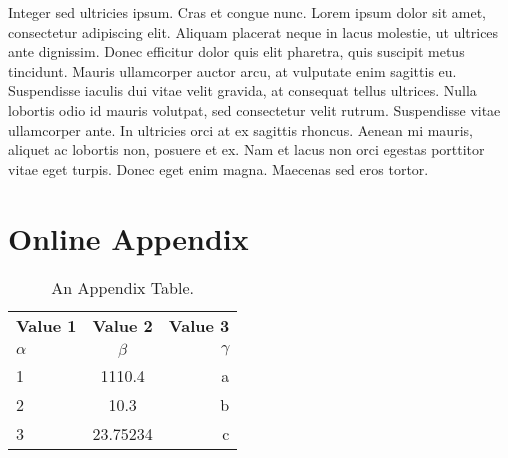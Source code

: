 \documentclass[man]{apa7}
\begin{document}
Integer sed ultricies ipsum. Cras et congue nunc. Lorem ipsum dolor sit amet, consectetur adipiscing elit. Aliquam placerat neque in lacus molestie, ut ultrices ante dignissim. Donec efficitur dolor quis elit pharetra, quis suscipit metus tincidunt. Mauris ullamcorper auctor arcu, at vulputate enim sagittis eu. Suspendisse iaculis dui vitae velit gravida, at consequat tellus ultrices. Nulla lobortis odio id mauris volutpat, sed consectetur velit rutrum. Suspendisse vitae ullamcorper ante. In ultricies orci at ex sagittis rhoncus. Aenean mi mauris, aliquet ac lobortis non, posuere et ex. Nam et lacus non orci egestas porttitor vitae eget turpis. Donec eget enim magna. Maecenas sed eros tortor.

\begingroup
\def\enotesize{\normalsize}
\theendnotes
\endgroup

\printbibliography

\appendix

\section{Online Appendix}

\begin{table}
	\begin{center}
		\caption{An Appendix Table.}
		\label{tab:apptable}
		\begin{tabular}{l|c|r} %
			\textbf{Value 1} & \textbf{Value 2} & \textbf{Value 3}\\
			$\alpha$ & $\beta$ & $\gamma$ \\
			\hline
			1 & 1110.4 & a\\
			2 & 10.3 & b\\
			3 & 23.75234 & c\\
		\end{tabular}
	\end{center}
\end{table}
\end{document}
